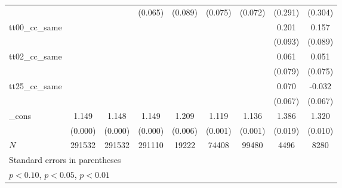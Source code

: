 {\begin{tabular}{l*{8}{c}}
            &                    &                    &     (0.065)        &     (0.089)        &     (0.075)        &     (0.072)        &     (0.291)        &     (0.304)        \\
[1em]
tt00\_cc\_same&                    &                    &                    &                    &                    &                    &       0.201\sym{*} &       0.157\sym{+} \\
            &                    &                    &                    &                    &                    &                    &     (0.093)        &     (0.089)        \\
[1em]
tt02\_cc\_same&                    &                    &                    &                    &                    &                    &       0.061        &       0.051        \\
            &                    &                    &                    &                    &                    &                    &     (0.079)        &     (0.075)        \\
[1em]
tt25\_cc\_same&                    &                    &                    &                    &                    &                    &       0.070        &      -0.032        \\
            &                    &                    &                    &                    &                    &                    &     (0.067)        &     (0.067)        \\
[1em]
\_cons      &       1.149\sym{**}&       1.148\sym{**}&       1.149\sym{**}&       1.209\sym{**}&       1.119\sym{**}&       1.136\sym{**}&       1.386\sym{**}&       1.320\sym{**}\\
            &     (0.000)        &     (0.000)        &     (0.000)        &     (0.006)        &     (0.001)        &     (0.001)        &     (0.019)        &     (0.010)        \\
\hline
\(N\)       &      291532        &      291532        &      291110        &       19222        &       74408        &       99480        &        4496        &        8280        \\
\hline\hline
\multicolumn{9}{l}{\footnotesize Standard errors in parentheses}\\
\multicolumn{9}{l}{\footnotesize \sym{+} \(p<0.10\), \sym{*} \(p<0.05\), \sym{**} \(p<0.01\)}\\
\end{tabular}
}
